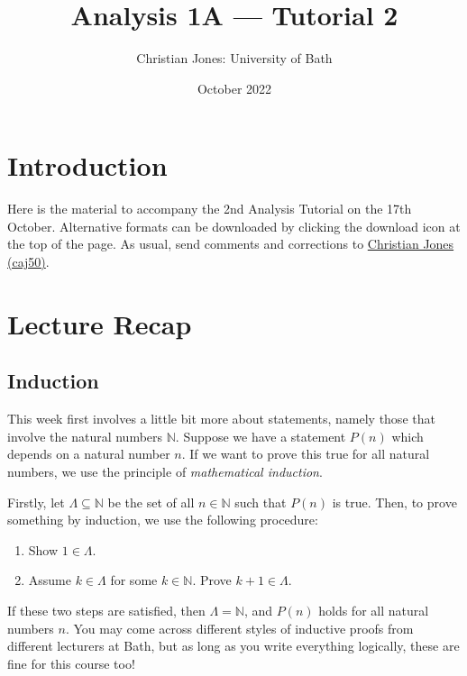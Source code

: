 \documentclass[
  17pt,
  a4paper]{extarticle}
\title{Analysis 1A --- Tutorial 2}
\author{Christian Jones: University of Bath}
\date{October 2022}
\providecommand{\tightlist}{%
  \setlength{\itemsep}{0pt}\setlength{\parskip}{0pt}}
\theoremstyle{plain}
\theoremstyle{definition}
\theoremstyle{plain}
\theoremstyle{plain}
\theoremstyle{plain}
\theoremstyle{plain}
\theoremstyle{definition}
\theoremstyle{definition}
\newtheorem*{Order Axioms*}{Order Axioms}\newtheorem{Order Axioms}{Order Axioms}[section]
\theoremstyle{remark}
\theoremstyle{remark}
\renewcommand{\;}{\,}
\begin{document}
\maketitle

{
\setcounter{tocdepth}{2}
\tableofcontents
}
\newpage
{}

\hypertarget{introduction}{%
\section*{Introduction}\label{introduction}}

Here is the material to accompany the 2nd Analysis Tutorial on the 17th October. Alternative formats can be downloaded by clicking the download icon at the top of the page. As usual, send comments and corrections to \href{mailto:caj50@bath.ac.uk}{Christian Jones (caj50)}.

\hypertarget{lecture-recap}{%
\section{Lecture Recap}\label{lecture-recap}}

\hypertarget{induction}{%
\subsection{Induction}\label{induction}}

This week first involves a little bit more about statements, namely those that involve the natural numbers \(\mathbb{N}\). Suppose we have a statement \(P(n)\) which depends on a natural number \(n\). If we want to prove this true for all natural numbers, we use the principle of \emph{mathematical induction}.

Firstly, let \(\Lambda \subseteq \mathbb{N}\) be the set of all \(n \in \mathbb{N}\) such that \(P(n)\) is true. Then, to prove something by induction, we use the following procedure:

\begin{enumerate}
\def\labelenumi{\arabic{enumi}.}
\tightlist
\item
  Show \(1 \in \Lambda\).
\item
  Assume \(k \in \Lambda\) for some \(k \in \mathbb{N}\). Prove \(k + 1 \in \Lambda\).
\end{enumerate}

If these two steps are satisfied, then \(\Lambda = \mathbb{N}\), and \(P(n)\) holds for all natural numbers \(n\). You may come across different styles of inductive proofs from different lecturers at Bath, but as long as you write everything logically, these are fine for this course too!
\end{document}
